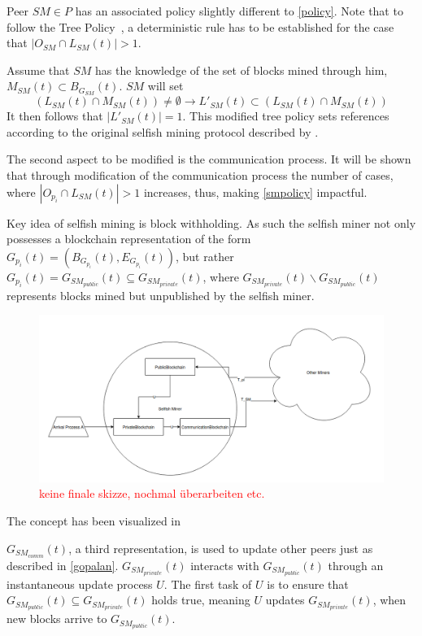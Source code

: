 Peer $SM \in P$ has an associated policy slightly different to \ref{policy}. Note that to follow the Tree Policy~\citep{gopalan}, a deterministic rule has to be established for the case that $|O_{SM} \cap L_{SM}(t)| > 1$.

Assume that $SM$ has the knowledge of the set of blocks mined through him, $M_{SM}(t) \subset B_{G_{SM}}(t)$. $SM$ will set 
\begin{equation}
(L_{SM}(t) \cap M_{SM}(t)) \neq \emptyset \rightarrow L'_{SM}(t) \subset ( L_{SM}(t) \cap M_{SM}(t)) 
\label{smpolicy}
\end{equation}
It then follows that $|L'_{SM}(t)|=1$.
This modified tree policy sets references according to the original selfish mining protocol described by \citeauthor{eyal}.

The second aspect to be modified is the communication process. It will be shown that through modification of the communication process the number of cases, where $|O_{p_i} \cap L_{SM}(t)| > 1$ increases, thus, making \ref{smpolicy} impactful.

Key idea of selfish mining is block withholding. As such the selfish miner not only possesses a blockchain representation of the form $G_{p_i}(t) = (B_{G_{p_i}}(t),E_{G_{p_i}}(t))$, but rather $G_{p_i}(t) = G_{SM_{public}}(t)\subseteq G_{SM_{private}}(t)$, where $G_{SM_{private}}(t)\backslash G_{SM_{public}}(t)$ represents blocks mined but unpublished by the selfish miner.

\begin{figure}
\includegraphics[width=\linewidth]{figures/model_vis.png}
\caption{\textcolor{red}{keine finale skizze, nochmal überarbeiten etc.}}
\label{fig:model_vis}
\end{figure}

The concept has been visualized in 

$G_{SM_{comm}}(t)$, a third representation, is used to update other peers just as described in \ref{gopalan}. $G_{SM_{private}}(t)$ interacts with $G_{SM_{public}}(t)$ through an instantaneous update process $U$.
The first task of $U$ is to ensure that $G_{SM_{public}}(t)\subseteq G_{SM_{private}}(t)$ holds true, meaning $U$ updates $G_{SM_{private}}(t)$, when new blocks arrive to $G_{SM_{public}}(t)$.

